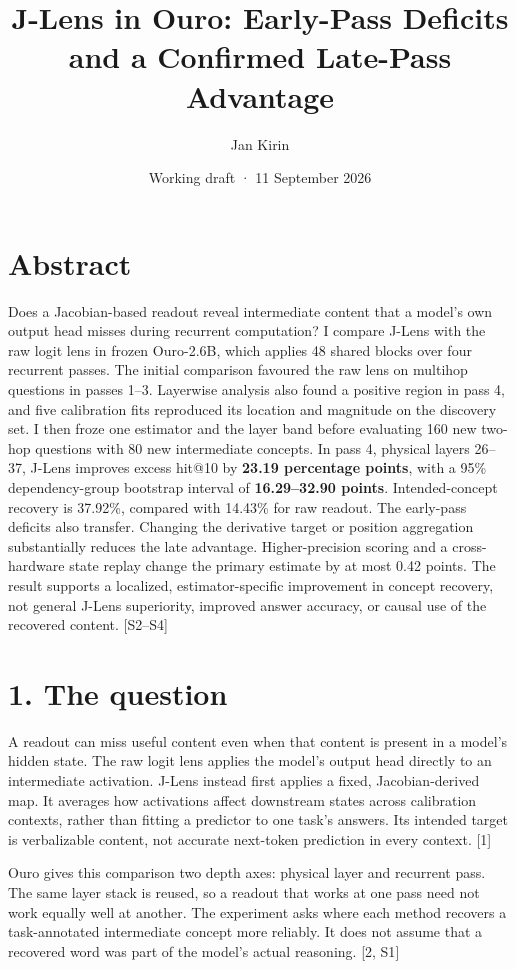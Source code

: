 \documentclass[
  11pt,
  a4paper,
]{article}
\title{J-Lens in Ouro: Early-Pass Deficits and a Confirmed Late-Pass
Advantage}
\author{Jan Kirin}
\date{Working draft · 11 September 2026}
\begin{document}
\maketitle

\section{Abstract}\label{abstract}

Does a Jacobian-based readout reveal intermediate content that a model's
own output head misses during recurrent computation? I compare J-Lens
with the raw logit lens in frozen Ouro-2.6B, which applies 48 shared
blocks over four recurrent passes. The initial comparison favoured the
raw lens on multihop questions in passes 1--3. Layerwise analysis also
found a positive region in pass 4, and five calibration fits reproduced
its location and magnitude on the discovery set. I then froze one
estimator and the layer band before evaluating 160 new two-hop questions
with 80 new intermediate concepts. In pass 4, physical layers 26--37,
J-Lens improves excess hit@10 by \textbf{23.19 percentage points}, with
a 95\% dependency-group bootstrap interval of \textbf{16.29--32.90
points}. Intended-concept recovery is 37.92\%, compared with 14.43\% for
raw readout. The early-pass deficits also transfer. Changing the
derivative target or position aggregation substantially reduces the late
advantage. Higher-precision scoring and a cross-hardware state replay
change the primary estimate by at most 0.42 points. The result supports
a localized, estimator-specific improvement in concept recovery, not
general J-Lens superiority, improved answer accuracy, or causal use of
the recovered content. {[}S2--S4{]}

\section{1. The question}\label{the-question}

A readout can miss useful content even when that content is present in a
model's hidden state. The raw logit lens applies the model's output head
directly to an intermediate activation. J-Lens instead first applies a
fixed, Jacobian-derived map. It averages how activations affect
downstream states across calibration contexts, rather than fitting a
predictor to one task's answers. Its intended target is verbalizable
content, not accurate next-token prediction in every context. {[}1{]}

Ouro gives this comparison two depth axes: physical layer and recurrent
pass. The same layer stack is reused, so a readout that works at one
pass need not work equally well at another. The experiment asks where
each method recovers a task-annotated intermediate concept more
reliably. It does not assume that a recovered word was part of the
model's actual reasoning. {[}2, S1{]}
\end{document}
